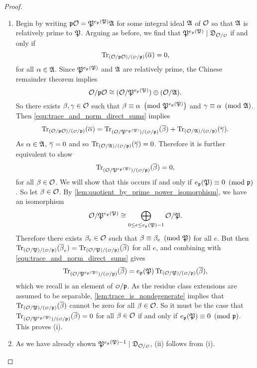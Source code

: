 \begin{proof}
      \begin{enumerate}[label=(\roman*)]
        \item Begin by writing $\mathfrak{p}\mathcal{O} = \mathfrak{P}^{e_{\mathfrak{p}}(\mathfrak{P})}\mathfrak{A}$ for some integral ideal $\mathfrak{A}$ of $\mathcal{O}$ so that $\mathfrak{A}$ is relatively prime to $\mathfrak{P}$. Arguing as before, we find that $\mf{P}^{e_{\mf{p}}(\mf{P})} \mid \mf{D}_{\mc{O}/\smc{O}}$ if and only if
        \[
          \Trace_{(\mc{O}/\mf{p}\mc{O})/(\smc{O}/\mf{p})}(\conj{\a}) = 0,
        \]
        for all $\alpha \in \mathfrak{A}$. Since $\mathfrak{P}^{e_{\mathfrak{p}}(\mathfrak{P})}$ and $\mathfrak{A}$ are relatively prime, the Chinese remainder theorem implies
        \[
          \mathcal{O}/\mathfrak{p}\mathcal{O} \cong (\mathcal{O}/\mathfrak{P}^{e_{\mathfrak{p}}(\mathfrak{P})}) \oplus (\mathcal{O}/\mathfrak{A}).
        \]
        So there exists $\beta,\gamma \in \mathcal{O}$ such that $\beta \equiv \alpha \ \left(\text{mod }\mathfrak{P}^{e_{\mathfrak{p}}(\mathfrak{P})}\right)$ and $\gamma \equiv \alpha \ \left(\text{mod }\mathfrak{A}\right)$. Then \cref{equ:trace_and_norm_direct_sums} implies
        \[
          \Trace_{(\mc{O}/\mf{p}\mc{O})/(\smc{O}/\mf{p})}(\conj{\a}) = \Trace_{(\mc{O}/\mf{P}^{e_{\mf{p}}(\mf{P})})/(\smc{O}/\mf{p})}(\conj{\b})+\Trace_{(\mc{O}/\mf{A})/(\smc{O}/\mf{p})}(\conj{\g}).
        \]
        As $\alpha \in \mathfrak{A}$, $\overline{\gamma} = 0$ and so $\Trace_{(\mc{O}/\mf{A})/(\smc{O}/\mf{p})}(\conj{\g}) = 0$. Therefore it is further equivalent to show
        \[
          \Trace_{(\mc{O}/\mf{P}^{e_{\mf{p}}(\mf{P})})/(\smc{O}/\mf{p})}(\conj{\b}) = 0,
        \]
        for all $\beta \in \mathcal{O}$. We will show that this occurs if and only if $e_{\mathfrak{p}}(\mathfrak{P}) \equiv 0 \ \left(\text{mod }\mathfrak{p}\right)$. So let $\beta \in \mathcal{O}$. By \cref{lem:quotient_by_prime_power_isomorphism}, we have an isomorphism
        \[
          \mathcal{O}/\mathfrak{P}^{e_{\mathfrak{p}}(\mathfrak{P})} \cong \bigoplus_{0 \le e \le e_{\mathfrak{p}}(\mathfrak{P})-1}\mathcal{O}/\mathfrak{P}.
        \]
        Therefore there exists $\beta_{e} \in \mathcal{O}$ such that $\beta \equiv \beta_{e} \ \left(\text{mod }\mathfrak{P}\right)$ for all $e$. But then $\Trace_{(\mc{O}/\mf{P})/(\smc{O}/\mf{p})}(\conj{\b}_{e}) = \Trace_{(\mc{O}/\mf{P})/(\smc{O}/\mf{p})}(\conj{\b})$ for all $e$, and combining with \cref{equ:trace_and_norm_direct_sums} gives
        \[
          \Trace_{(\mc{O}/\mf{P}^{e_{\mf{p}}(\mf{P})})/(\smc{O}/\mf{p})}(\conj{\b}) = e_{\mf{p}}(\mf{P})\Trace_{(\mc{O}/\mf{P})/(\smc{O}/\mf{p})}(\conj{\b}),
        \]
        which we recall is an element of $\smc{O}/\mf{p}$. As the residue class extensions are assumed to be separable, \cref{lem:trace_is_nondegenerate} implies that $\Trace_{(\mc{O}/\mf{P})/(\smc{O}/\mf{p})}(\conj{\b})$ cannot be zero for all $\beta \in \mathcal{O}$. So it must be the case that $\Trace_{(\mc{O}/\mf{P}^{e_{\mf{p}}(\mf{P})})/(\smc{O}/\mf{p})}(\conj{\b}) = 0$ for all $\beta \in \mathcal{O}$ if and only if $e_{\mathfrak{p}}(\mathfrak{P}) \equiv 0 \ \left(\text{mod }\mathfrak{p}\right)$. This proves (i).
        \item As we have already shown $\mf{P}^{e_{\mf{p}}(\mf{P})-1} \mid \mf{D}_{\mc{O}/\smc{O}}$, (ii) follows from (i).
      \end{enumerate}
    \end{proof}

